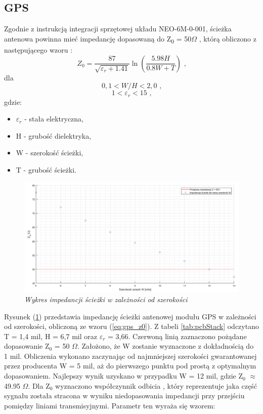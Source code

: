 \documentclass[eng,printmode]{mgr}
\begin{document}
\subsection*{GPS}
Zgodnie z instrukcją integracji sprzętowej układu NEO-6M-0-001, ścieżka antenowa powinna mieć impedancję dopasowaną do Z\textsubscript{0} = 50\textbf{$\Omega$} \cite{gpsHW}, którą obliczono z następującego wzoru  \cite{highSpeedDesign}:
\begin{equation}
Z_0= \frac{87}{\sqrt{\varepsilon_r + 1.41}}\ln{\left(\frac{5.98H}{0.8W + T}\right)} \textrm{ ,} \label{eq:gps_z0}
\end{equation}
dla 
$$
0,1 < W/H < 2,0 \textrm{ ,}
$$
$$
1 < \varepsilon_r < 15 \textrm{ ,}
$$
gdzie:
\begin{itemize}
  \item \textbf{$\varepsilon_r$} - stała elektryczna,
  \item H - grubość dielektryka,
  \item W - szerokość ścieżki,
  \item T - grubość ścieżki.
\end{itemize}
\newpage
\begin{figure}[!h]
    \centering
    \includegraphics[width=\textwidth]{plots/gpsZ0.png}
    \caption{\textit{ Wykres impedancji ścieżki w zależności od szerokości}}
    \label{fig:gpsImp}
\end{figure}

Rysunek (\ref{fig:gpsImp}) przedstawia impedancję ścieżki antenowej modułu GPS w zależności od szerokości, obliczoną ze wzoru (\ref{eq:gps_z0}). Z tabeli \ref{tab:pcbStack} odczytano T = 1,4 mil, H = 6,7 mil oraz \textbf{$\varepsilon_r$} = 3,66. Czerwoną linią zaznaczono pożądane dopasowanie Z$_0$ = 50 $\Omega$. Założono, że W zostanie wyznaczone z dokładnością do 1 mil. Obliczenia wykonano zaczynając od najmniejszej szerokości gwarantowanej przez producenta W = 5 mil, aż do pierwszego punktu pod prostą z optymalnym dopasowaniem. Najlepszy wynik uzyskano w przypadku W = 12 mil, gdzie Z$_0$ $\approx$ 49.95 $\Omega$.
Dla Z$_0$ wyznaczono współczynnik odbicia \cite{highSpeedDesign}, który reprezentuje jaka część sygnału została stracona w wyniku niedopasowania impedancji przy przejściu pomiędzy liniami transmisyjnymi. Parametr ten wyraża się wzorem:
\end{document}
